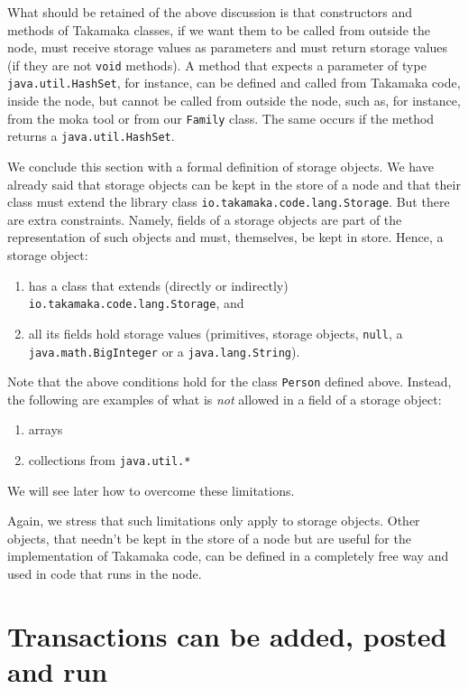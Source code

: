 What should be retained of the above discussion is that constructors and
methods of Takamaka classes, if we want them to be called from outside the
node, must receive storage values as parameters and must return storage
values (if they are not \texttt{void} methods). A method that expects a parameter of
type \texttt{java.util.HashSet}, for instance, can be defined and called
from Takamaka code, inside the node, but cannot be called from outside the node,
such as, for instance, from the moka tool or from our \texttt{Family} class. The same
occurs if the method returns a \texttt{java.util.HashSet}.

We conclude this section with a formal definition of storage objects.
We have already said that storage objects can be kept in the store of a node
and that their class must extend the library class
\texttt{io.takamaka.code.lang.Storage}. But there are extra constraints. Namely,
fields of a storage objects are part of the representation of such
objects and must, themselves, be kept in store. Hence, a storage object:
%
\begin{enumerate}
\item has a class that extends (directly or indirectly) \texttt{io.takamaka.code.lang.Storage}, and
\item all its fields hold storage values (primitives, storage objects,
  \texttt{null}, a \texttt{java.math.BigInteger} or a \texttt{java.lang.String}).
\end{enumerate}
%
Note that the above conditions hold for the class \texttt{Person} defined above. Instead,
the following are examples of what is \emph{not} allowed in a field of a storage object:
%
\begin{enumerate}
\item arrays
\item collections from \texttt{java.util.*}
\end{enumerate}
%
We will see later how to overcome these limitations.

\begin{commentbox}
Again, we stress that such limitations only apply to storage objects.
Other objects, that needn't be kept in the store of a node but are useful for
the implementation of Takamaka code, can be defined in a completely free way
and used in code that runs in the node.
\end{commentbox}

\section{Transactions can be added, posted and run}\label{sec:add_post_run}

